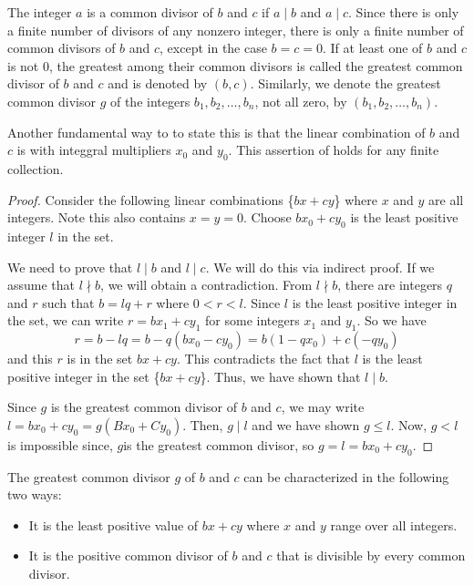 \documentclass[11pt]{article}
\begin{document}
\begin{definition}
	The integer $a$ is a common divisor of $b$ and $c$ if $a \mid b$ and $a \mid c$. Since there is only a finite number of divisors of any nonzero integer, there is only a finite number of common divisors of $b$ and $c$, except in the case $b = c = 0$. If at least one of $b$ and $c$ is not $0$, the greatest among their common divisors is called the greatest common divisor of $b$ and $c$ and is denoted by $(b, c)$. Similarly, we denote the greatest common divisor $g$ of the integers $b_1, b_2, \ldots, b_n$, not all zero, by $(b_1, b_2, \ldots, b_n)$.
\end{definition}

\begin{fact}
	Another fundamental way to to state this is that the linear combination of \( b \) and \( c \) is with integgral multipliers \( x_0 \) and \( y_0 \). This assertion of holds for any finite collection.
\end{fact}
\begin{proof}
	Consider the following linear combinations \{\(bx + cy\)\} where \(x\) and \(y\) are all integers. Note this also contains \(x = y = 0\). Choose \(bx_0 + cy_0 \) is the least positive integer \(l\) in the set.

	We need to prove that \(l \mid b\) and \(l \mid c\). We will do this via
	indirect proof. If we assume that \(l \nmid b\), we will obtain a
	contradiction. From \(l \nmid b\), there are integers \(q\) and \(r\) such that
	\(b = lq + r\) where \(0 < r < l\). Since \(l\) is the least positive integer
	in the set, we can write \(r = bx_1 + cy_1\) for some integers \(x_1\) and
	\(y_1\). So we have \[r = b - lq = b - q(bx_0 - cy_0) = b(1 - qx_0) + c(-qy_0)\]  and this \(r\) is in the set {\(bx + cy\)}. This contradicts the fact that
	\(l\) is the least positive integer in the set \{\(bx + cy\)\}. Thus, we have
	shown that \(l \mid b\).

	Since \(g\) is the greatest common divisor of \(b\) and \(c\), we may write \(l
	= bx_0 + cy_0 = g(Bx_0 + Cy_0)\). Then, \(g \mid l\) and we have shown \(g \leq
	l\). Now, \(g < l\) is impossible since, \(g\)is the greatest common divisor,
	so \(g = l = bx_0 + cy_0\).
\end{proof}

\begin{theorem}\label{1.4}
	The greatest common divisor \(g\) of \(b\) and \(c\) can be characterized in the following two ways:
	\begin{itemize}
		\item It is the least positive value of \(bx + cy\) where \(x\) and \(y\) range over
		      all integers.
		\item It is the positive common divisor of \(b\) and \(c\) that is divisible by every
		      common divisor.
	\end{itemize}
\end{theorem}
\end{document}
